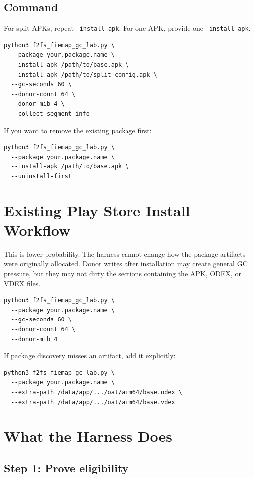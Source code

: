 \documentclass[11pt]{article}
\begin{document}
\subsection{Command}

For split APKs, repeat \texttt{--install-apk}.  For one APK, provide one
\texttt{--install-apk}.

\begin{verbatim}
python3 f2fs_fiemap_gc_lab.py \
  --package your.package.name \
  --install-apk /path/to/base.apk \
  --install-apk /path/to/split_config.apk \
  --gc-seconds 60 \
  --donor-count 64 \
  --donor-mib 4 \
  --collect-segment-info
\end{verbatim}

If you want to remove the existing package first:

\begin{verbatim}
python3 f2fs_fiemap_gc_lab.py \
  --package your.package.name \
  --install-apk /path/to/base.apk \
  --uninstall-first
\end{verbatim}

\section{Existing Play Store Install Workflow}

This is lower probability.  The harness cannot change how the package artifacts
were originally allocated.  Donor writes after installation may create general
GC pressure, but they may not dirty the sections containing the APK, ODEX, or
VDEX files.

\begin{verbatim}
python3 f2fs_fiemap_gc_lab.py \
  --package your.package.name \
  --gc-seconds 60 \
  --donor-count 64 \
  --donor-mib 4
\end{verbatim}

If package discovery misses an artifact, add it explicitly:

\begin{verbatim}
python3 f2fs_fiemap_gc_lab.py \
  --package your.package.name \
  --extra-path /data/app/.../oat/arm64/base.odex \
  --extra-path /data/app/.../oat/arm64/base.vdex
\end{verbatim}

\section{What the Harness Does}

\subsection{Step 1: Prove eligibility}
\end{document}
